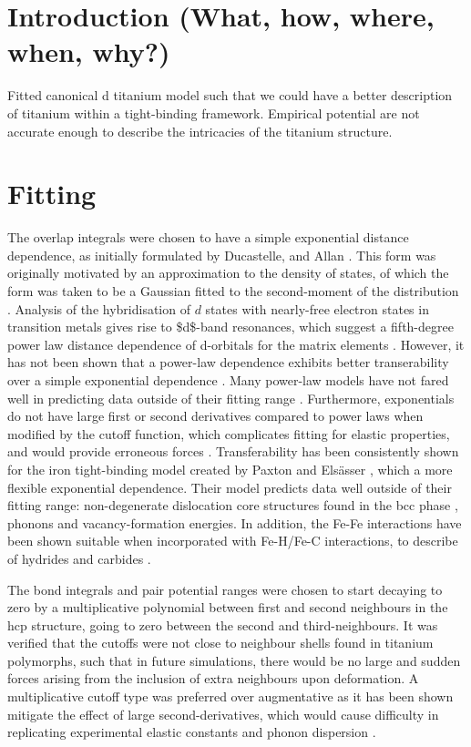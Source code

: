 \documentclass[a4paper,12pt,oneside,print,numbered,index,PageStyleIII]{PhDThesisPSnPDF}
\begin{document}
\section{Introduction (What, how, where, when, why?)}
\label{sec:orgdd09327}
Fitted canonical d titanium model such that we could have a better
description of titanium within a tight-binding framework. Empirical
potential are not accurate enough to describe the intricacies of the
titanium structure.

\section{Fitting}
\label{sec:org9a1bb20}

The overlap integrals were chosen to have a simple exponential
distance dependence, as initially formulated by Ducastelle,
\cite{Ducastelle1970c} and Allan \cite{Allan1976}. This form was
originally motivated by an approximation to the density of states,
of which the form was taken to be a Gaussian fitted to the
second-moment of the distribution \cite{Spanjaard1984}. Analysis of
the hybridisation of \(d\) states with nearly-free electron states in
transition metals gives rise to \$d\$-band resonances, which suggest a
fifth-degree power law distance dependence of d-orbitals for the
matrix elements
\cite{Heine1967,Heine1980,Andersen1985,Harrison1989,Pettifor1995}. However, it has
not been shown that a power-law dependence exhibits better
transerability over a simple exponential dependence
\cite{Skinner1991,Paxton2010}. Many power-law models have not
fared well in predicting data outside of their fitting range
\cite{Paxton1987,Paxton1989,Girshick1998a,Trinkle2006,Ferrari2019a}. Furthermore,
exponentials do not have large first or second derivatives compared
to power laws when modified by the cutoff function, which
complicates fitting for elastic properties, and would provide
erroneous forces
\cite{Pashov2012}. Transferability has been consistently
shown for the iron tight-binding model created by Paxton and
Elsässer \cite{Paxton2010}, which a more flexible exponential
dependence. Their model predicts data well outside of their fitting
range: non-degenerate dislocation core structures found in the bcc
phase \cite{Simpsonb,Simpson2020}, phonons and vacancy-formation
energies. In addition, the Fe-Fe interactions have been shown
suitable when incorporated with Fe-H/Fe-C interactions, to describe
of hydrides and carbides \cite{Paxton2010,Paxton2013}.


The bond integrals and pair potential ranges were chosen to start
decaying to zero by a multiplicative polynomial between first and
second neighbours in the hcp structure, going to zero between the
second and third-neighbours. It was verified that the cutoffs were
not close to neighbour shells found in titanium
polymorphs, such that in future simulations, there would be no large
and sudden forces arising from the inclusion of extra neighbours
upon deformation. A multiplicative cutoff type was preferred over
augmentative as it has been shown mitigate the effect of large
second-derivatives, which would cause difficulty in replicating
experimental elastic constants and phonon dispersion
\cite{Pashov2012}.
\end{document}
